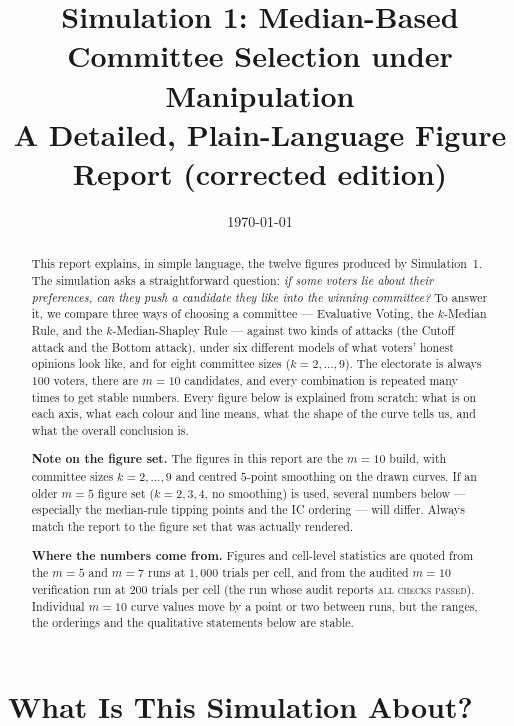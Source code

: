 \documentclass[11pt,a4paper]{article}
\title{\bfseries Simulation 1: Median-Based Committee Selection under Manipulation\\[0.4em]
\large A Detailed, Plain-Language Figure Report (corrected edition)}
\author{}
\date{\today}
\begin{document}
\maketitle

\begin{abstract}
This report explains, in simple language, the twelve figures produced by
Simulation~1. The simulation asks a straightforward question: \emph{if some
voters lie about their preferences, can they push a candidate they like into
the winning committee?} To answer it, we compare three ways of choosing a
committee --- Evaluative Voting, the \(k\)-Median Rule, and the
\(k\)-Median-Shapley Rule --- against two kinds of attacks (the Cutoff attack
and the Bottom attack), under six different models of what voters' honest
opinions look like, and for eight committee sizes (\(k = 2, \dots, 9\)). The
electorate is always \(100\) voters, there are \(m = 10\) candidates, and
every combination is repeated many times to get stable numbers. Every figure
below is explained from scratch: what is on each axis, what each colour and
line means, what the shape of the curve tells us, and what the overall
conclusion is.

\medskip
\noindent\textbf{Note on the figure set.} The figures in this report are the
\(m = 10\) build, with committee sizes \(k = 2, \dots, 9\) and centred
\(5\)-point smoothing on the drawn curves. If an older \(m = 5\) figure set
(\(k = 2,3,4\), no smoothing) is used, several numbers below --- especially
the median-rule tipping points and the IC ordering --- will differ. Always
match the report to the figure set that was actually rendered.

\medskip
\noindent\textbf{Where the numbers come from.} Figures and cell-level
statistics are quoted from the \(m = 5\) and \(m = 7\) runs at \(1{,}000\)
trials per cell, and from the audited \(m = 10\) verification run at \(200\)
trials per cell (the run whose audit reports \textsc{all checks passed}).
Individual \(m = 10\) curve values move by a point or two between runs, but
the ranges, the orderings and the qualitative statements below are stable.

\end{abstract}

\tableofcontents
\clearpage

\section{What Is This Simulation About?}
\end{document}
